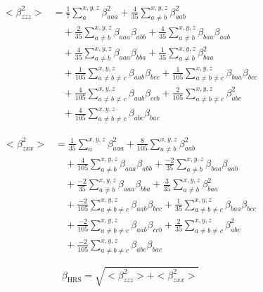 \documentclass{article}
\begin{document}
	\begin{align}\label{eq:betazzz}
	<\beta^{2}_{zzz}> &= \frac{1}{7} \sum_{a}^{x,y,z} \beta^{2}_{aaa} + \frac{4}{35} \sum_{a\neq b}^{x,y,z} \beta^{2}_{aab} \nonumber \\
	&\quad + \frac{2}{35} \sum_{a\neq b}^{x,y,z} \beta_{aaa}\beta_{abb} + \frac{4}{35} \sum_{a\neq b}^{x,y,z} \beta_{baa}\beta_{aab} \nonumber \\
	&\quad + \frac{4}{35} \sum_{a\neq b}^{x,y,z} \beta_{aaa}\beta_{bba} + \frac{1}{35} \sum_{a\neq b}^{x,y,z} \beta^{2}_{baa}\nonumber \\
	&\quad + \frac{1}{105} \sum_{a\neq b\neq c}^{x,y,z} \beta_{aab}\beta_{bcc} +\frac{1}{105} \sum_{a\neq b\neq c}^{x,y,z} \beta_{baa}\beta_{bcc}\nonumber \\
	&\quad + \frac{4}{105} \sum_{a\neq b\neq c}^{x,y,z} \beta_{aab}\beta_{ccb} +\frac{2}{105} \sum_{a\neq b\neq c}^{x,y,z} \beta^{2}_{abc}\nonumber \\
	&\quad + \frac{4}{105} \sum_{a\neq b\neq c}^{x,y,z} \beta_{abc}\beta_{bac} 
	\end{align}
	
	\begin{align}\label{eq:betazxx}
	<\beta^{2}_{zxx}> &= \frac{1}{35} \sum_{a}^{x,y,z} \beta^{2}_{aaa} + \frac{8}{105} \sum_{a\neq b}^{x,y,z} \beta^{2}_{aab} \nonumber \\
	&\quad + \frac{4}{105} \sum_{a\neq b}^{x,y,z} \beta_{aaa}\beta_{abb} + \frac{-2}{35} \sum_{a\neq b}^{x,y,z} \beta_{baa}\beta_{aab} \nonumber \\
	&\quad + \frac{-2}{35} \sum_{a\neq b}^{x,y,z} \beta_{aaa}\beta_{bba} + \frac{3}{35} \sum_{a\neq b}^{x,y,z} \beta^{2}_{baa}\nonumber \\
	&\quad + \frac{-2}{105} \sum_{a\neq b\neq c}^{x,y,z} \beta_{aab}\beta_{bcc} +\frac{1}{35} \sum_{a\neq b\neq c}^{x,y,z} \beta_{baa}\beta_{bcc}\nonumber \\
	&\quad + \frac{-2}{105} \sum_{a\neq b\neq c}^{x,y,z} \beta_{aab}\beta_{ccb} +\frac{2}{35} \sum_{a\neq b\neq c}^{x,y,z} \beta^{2}_{abc}\nonumber \\
	&\quad + \frac{-2}{105} \sum_{a\neq b\neq c}^{x,y,z} \beta_{abc}\beta_{bac} 
	\end{align}
	
	\begin{equation}\label{eq:betaHRS}
	\beta_{\text{HRS}}= \sqrt{<\beta^{2}_{zzz}>+<\beta^{2}_{zxx}>}
	\end{equation} 
	
\end{document}
